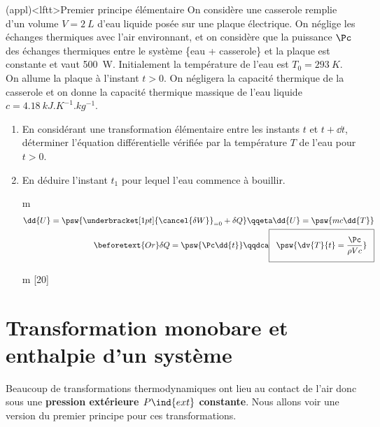 \documentclass[../../main/main.tex]{subfiles}
\begin{document}
\begin{tcb*}(appl)<lftt>{Premier principe élémentaire}
	On considère une casserole remplie d’un volume $V = \SI{2}{L}$ d’eau liquide
	posée sur une plaque électrique. On néglige les échanges thermiques avec l’air
	environnant, et on considère que la puissance $\Pc$ des échanges thermiques
	entre le système \{eau + casserole\} et la plaque est constante et vaut
	\SI{500}{W}.
	\smallbreak
	Initialement la température de l’eau est $T_0 = \SI{293}{K}$. On allume la plaque
	à l’instant $t> 0$. On négligera la capacité thermique de la casserole et on
	donne la capacité thermique massique de l’eau liquide $ c =
		\SI{4,18}{kJ.K^{-1}.kg^{-1}}$.
	\begin{enumerate}[label=\sqenumi]
		\item En considérant une transformation élémentaire entre les instants $t$ et
		      $t+\dd{t}$, déterminer l'équation différentielle vérifiée par la température
		      $T$ de l'eau pour $t>0$.
		\item En déduire l'instant $t_1$ pour lequel l'eau commence à bouillir.
	\end{enumerate}
	\tcblower
	\begin{enumerate}[label=\sqenumi]
		\item[m]
			\begin{align*}
				\dd{U} = \psw{\underbracket[1pt]{\cancel{\delta W}}_{=0} + \delta Q}
				\qqeta
				\dd{U} = \psw{mc \dd{T}}
				\\\beforetext{Or}
				\delta Q = \psw{\Pc \dd{t}}
				\qqdca
				\setlength{\fboxsep}{3mm}
				\boxed{\psw{\dv{T}{t} = \frac{\Pc}{\rho Vc}}}
			\end{align*}
			\item[m][20]
			\psw{%
				\[
					T - T_0 = \frac{\Pc}{\rho Vc}t
					\Lra
					\boxed{t_b = (T_b - T_0) \frac{\rho Vc}{\Pc}}
					\Ra
					\xul{t_b = \SI{1340}{s} = \SI{22}{m}}
				\]
			}%
	\end{enumerate}
\end{tcb*}

\section{Transformation monobare et enthalpie d’un système}
Beaucoup de transformations thermodynamiques ont lieu au contact de l’air donc
sous une \textbf{pression extérieure $P\ind{ext}$ constante}. Nous allons voir
une version du premier principe pour ces transformations.
\end{document}

